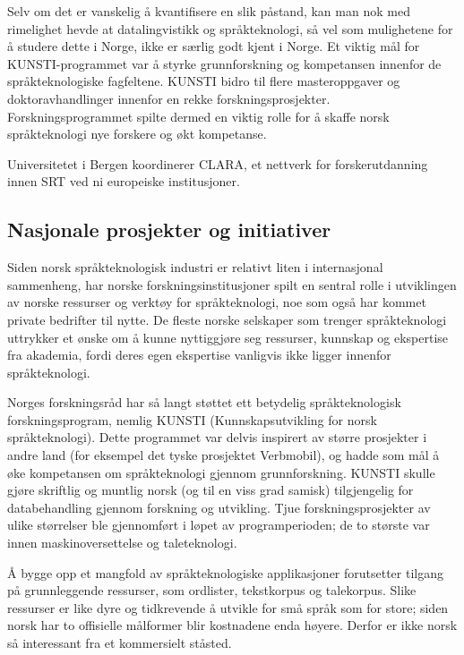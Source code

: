 \begin{multicols}{2}
Selv om det er vanskelig å kvantifisere en slik påstand, kan man nok med rimelighet hevde at datalingvistikk og språkteknologi, så vel som mulighetene for å studere dette i Norge, ikke er særlig godt kjent i Norge. Et viktig mål for KUNSTI-programmet var å styrke grunnforskning og kompetansen innenfor de språkteknologiske fagfeltene. KUNSTI bidro til flere masteroppgaver og doktoravhandlinger innenfor en rekke forskningsprosjekter. Forskningsprogrammet spilte dermed en viktig rolle for å skaffe norsk språkteknologi nye forskere og økt kompetanse.

Universitetet i Bergen koordinerer CLARA, et nettverk for forskerutdanning innen SRT ved ni europeiske institusjoner.

\subsection{Nasjonale prosjekter og initiativer}

Siden norsk språkteknologisk industri er relativt liten i internasjonal sammenheng, har norske forskningsinstitusjoner spilt en sentral rolle i utviklingen av norske ressurser og verktøy for språkteknologi, noe som også har kommet private bedrifter til nytte. 
De fleste norske selskaper som trenger språkteknologi uttrykker et ønske om å kunne nyttiggjøre seg ressurser, kunnskap og ekspertise fra akademia, fordi deres egen ekspertise vanligvis ikke ligger innenfor språkteknologi. 

Norges forskningsråd har så langt støttet ett betydelig språkteknologisk forskningsprogram, nemlig KUNSTI (Kunnskapsutvikling for norsk språkteknologi). 
Dette programmet var delvis inspirert av større prosjekter i andre land (for eksempel det tyske prosjektet Verbmobil), og hadde som mål å øke kompetansen om språkteknologi gjennom grunnforskning. KUNSTI skulle gjøre skriftlig og muntlig norsk (og til en viss grad samisk) tilgjengelig for databehandling gjennom forskning og utvikling. Tjue forskningsprosjekter av ulike størrelser ble gjennomført i løpet av programperioden; de to største var innen maskinoversettelse og taleteknologi.

Å bygge opp et mangfold av språkteknologiske applikasjoner forutsetter tilgang på grunnleggende ressurser, som ordlister, tekstkorpus og talekorpus. Slike ressurser er like dyre og tidkrevende å utvikle for små språk som for store; siden norsk har to offisielle målformer blir kostnadene enda høyere. 
Derfor er ikke norsk så interessant fra et kommersielt ståsted.


\end{multicols}
